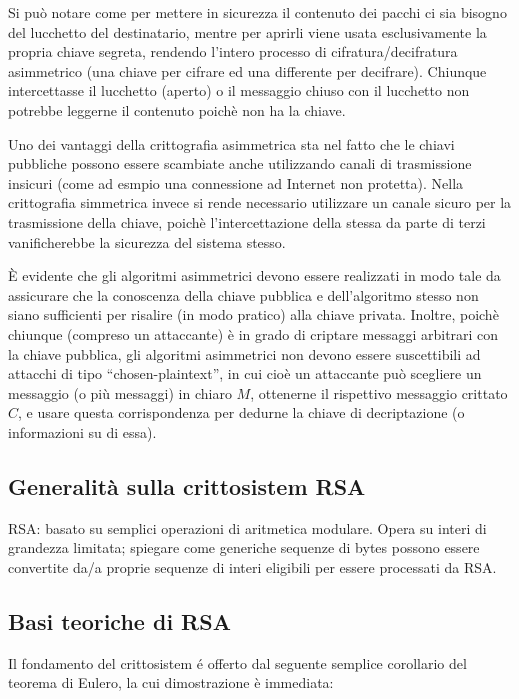 \documentclass[pdflatex,11pt,a4paper,oneside]{article}
\begin{document}
Si pu\`o notare come per mettere in sicurezza il contenuto dei pacchi
ci sia bisogno del lucchetto del destinatario, mentre per aprirli viene
usata esclusivamente la propria chiave segreta, rendendo l'intero processo
di cifratura/decifratura asimmetrico (una chiave per cifrare ed una
differente per decifrare). Chiunque intercettasse il lucchetto (aperto)
o il messaggio chiuso con il lucchetto non potrebbe leggerne il contenuto
poich\`e non ha la chiave.

\medskip
Uno dei vantaggi della crittografia asimmetrica sta nel fatto che le
chiavi pubbliche possono essere scambiate anche utilizzando canali di
trasmissione insicuri (come ad esmpio una connessione ad Internet non
protetta). Nella crittografia simmetrica invece si rende necessario
utilizzare un canale sicuro per la trasmissione della chiave, poich\`e
l'intercettazione della stessa da parte di terzi vanificherebbe la
sicurezza del sistema stesso.

\medskip
\`E evidente che gli algoritmi asimmetrici devono essere realizzati in
modo tale da assicurare che la conoscenza della chiave pubblica e
dell'algoritmo stesso non siano sufficienti per risalire (in modo
pratico) alla chiave privata. Inoltre, poich\`e chiunque (compreso
un attaccante) \`e in grado di criptare messaggi arbitrari con la
chiave pubblica, gli algoritmi asimmetrici non devono essere
suscettibili ad attacchi di tipo ``chosen-plaintext'', in cui cio\`e
un attaccante pu\`o scegliere un messaggio (o pi\`u messaggi) in
chiaro $M$, ottenerne il rispettivo messaggio crittato $C$, e usare
questa corrispondenza per dedurne la chiave di decriptazione (o
informazioni su di essa).

\subsection{Generalit\`a sulla crittosistem RSA}

RSA: basato su semplici operazioni di aritmetica modulare. Opera su
interi di grandezza limitata; spiegare come generiche sequenze di
bytes possono essere convertite da/a proprie sequenze di interi
eligibili per essere processati da RSA.

\subsection{Basi teoriche di RSA}

Il fondamento del crittosistem \'e offerto dal seguente semplice
corollario del teorema di Eulero, la cui dimostrazione \`e immediata:
\end{document}
